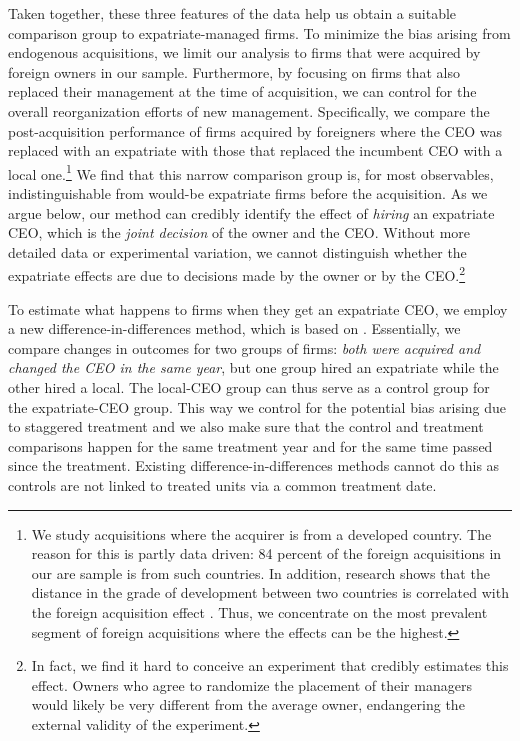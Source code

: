 \documentclass[12pt,a4paper]{article}
\begin{document}
Taken together, these three features of the data help us obtain a suitable comparison group to expatriate-managed firms. To minimize the bias arising from endogenous acquisitions, we limit our analysis to firms that were acquired by foreign owners in our sample. Furthermore, by focusing on firms that also replaced their management at the time of acquisition, we can control for the overall reorganization efforts of new management. Specifically, we compare the post-acquisition performance of firms acquired by foreigners where the CEO was replaced with an expatriate with those that replaced the incumbent CEO with a local one.\footnote{We study acquisitions where the acquirer is from a developed country. The reason for this is partly data driven: 84 percent of the foreign acquisitions in our are sample is from such countries. In addition, research shows that the distance in the grade of development between two countries is correlated with the foreign acquisition effect \citep{earle2018foreign}. Thus, we concentrate on the most prevalent segment of foreign acquisitions where the effects can be the highest.} We find that this narrow comparison group is, for most observables, indistinguishable from would-be expatriate firms before the acquisition. As we argue below, our method can credibly identify the effect of \emph{hiring} an expatriate CEO, which is the \emph{joint decision} of the owner and the CEO. Without more detailed data or experimental variation, we cannot distinguish whether the expatriate effects are due to decisions made by the owner or by the CEO.\footnote{In fact, we find it hard to conceive an experiment that credibly estimates this effect. Owners who agree to randomize the placement of their managers would likely be very different from the average owner, endangering the external validity of the experiment.}

To estimate what happens to firms when they get an expatriate CEO, we employ a new difference-in-differences method, which is based on \cite{callaway2021difference}. Essentially, we compare changes in outcomes for two groups of firms: \emph{both were acquired and changed the CEO in the same year}, but one group hired an expatriate while the other hired a local. The local-CEO group can thus serve as a control group for the expatriate-CEO group. This way we control for the potential bias arising due to staggered treatment and we also make sure that the control and treatment comparisons happen for the same treatment year and for the same time passed since the treatment. Existing difference-in-differences methods cannot do this as controls are not linked to treated units via a common treatment date.
\end{document}
